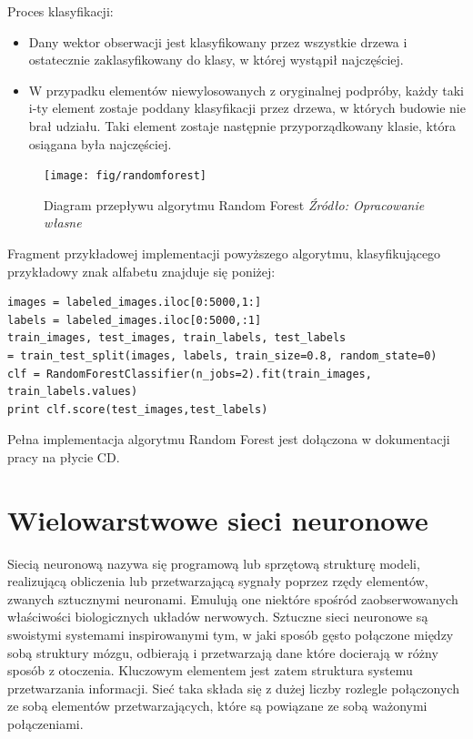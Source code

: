 \documentclass[brudnopis]{xmgr}
\begin{document}
Proces klasyfikacji:
\begin{itemize}
\item
Dany wektor obserwacji jest klasyfikowany przez wszystkie drzewa i ostatecznie zaklasyfikowany do klasy, w której wystąpił najczęściej.
\item
W przypadku elementów niewylosowanych z oryginalnej podpróby, każdy taki i-ty element zostaje poddany klasyfikacji przez drzewa, w których budowie nie brał udziału. Taki element zostaje następnie przyporządkowany klasie, która osiągana była najczęściej.
\end{itemize}

\begin{figure}[!tbh]
\centering
\texttt{[image: fig/randomforest]}
\caption{Diagram przepływu algorytmu Random Forest \emph{Źródło: Opracowanie własne}}
\end{figure}
\newpage

Fragment przykładowej implementacji powyższego algorytmu, klasyfikującego przykładowy znak alfabetu znajduje się poniżej:

\begin{verbatim}
images = labeled_images.iloc[0:5000,1:]
labels = labeled_images.iloc[0:5000,:1]
train_images, test_images, train_labels, test_labels 
= train_test_split(images, labels, train_size=0.8, random_state=0)
clf = RandomForestClassifier(n_jobs=2).fit(train_images, train_labels.values)
print clf.score(test_images,test_labels)
\end{verbatim}

Pełna implementacja algorytmu Random Forest jest dołączona w dokumentacji pracy na płycie CD. 

\section{Wielowarstwowe sieci neuronowe}

Siecią neuronową\cite{1}\cite{12} nazywa się programową lub sprzętową strukturę modeli, realizującą obliczenia lub przetwarzającą sygnały poprzez rzędy elementów, zwanych sztucznymi neuronami. Emulują one niektóre spośród zaobserwowanych właściwości biologicznych układów nerwowych. Sztuczne sieci neuronowe są swoistymi systemami inspirowanymi tym, w jaki sposób gęsto połączone między sobą struktury mózgu, odbierają i przetwarzają dane które docierają w różny sposób z otoczenia. Kluczowym elementem jest zatem struktura systemu przetwarzania informacji. Sieć taka składa się z dużej liczby rozlegle połączonych ze sobą elementów przetwarzających, które są powiązane ze sobą ważonymi połączeniami.
\end{document}
